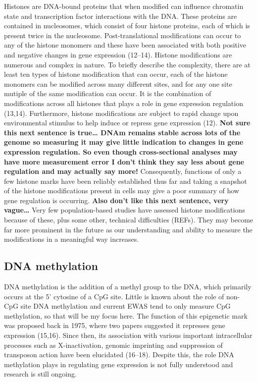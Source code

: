 \documentclass[11pt,twoside]{bristolthesis}
\begin{document}
Histones are DNA-bound proteins that when modified can influence chromatin state and transcription factor interactions with the DNA. These proteins are contained in nucleosomes, which consist of four histone proteins, each of which is present twice in the nucleosome. Post-translational modifications can occur to any of the histone monomers and these have been associated with both positive and negative changes in gene expression (12--14). Histone modifications are numerous and complex in nature. To briefly describe the complexity, there are at least ten types of histone modification that can occur, each of the histone monomers can be modified across many different sites, and for any one site mutiple of the same modification can occur. It is the combination of modifications across all histones that plays a role in gene expression regulation (13,14). Furthermore, histone modifications are subject to rapid change upon environmental stimulus to help induce or repress gene expression (12). \textbf{Not sure this next sentence is true\ldots{} DNAm remains stable across lots of the genome so measuring it may give little indication to changes in gene expression regulation. So even though cross-sectional analyses may have more measurement error I don't think they say less about gene regulation and may actually say more!} Consequently, functions of only a few histone marks have been reliably established thus far and taking a snapshot of the histone modifications present in cells may give a poor summary of how gene regulation is occurring. \textbf{Also don't like this next sentence, very vague\ldots{}} Very few population-based studies have assessed histone modifications because of these, plus some other, technical difficulties (REFs). They may become far more prominent in the future as our understanding and ability to measure the modifications in a meaningful way increases.

\hypertarget{dna-methylation}{%
\subsection{DNA methylation}\label{dna-methylation}}

DNA methylation is the addition of a methyl group to the DNA, which primarily occurs at the 5' cytosine of a CpG site. Little is known about the role of non-CpG site DNA methylation and current EWAS tend to only measure CpG methylation, so that will be my focus here. The function of this epigenetic mark was proposed back in 1975, where two papers suggested it represses gene expression (15,16). Since then, its association with various important intracellular processes such as X-inactivation, genomic imprinting and suppression of transposon action have been elucidated (16--18). Despite this, the role DNA methylation plays in regulating gene expression is not fully understood and research is still ongoing.
\end{document}
